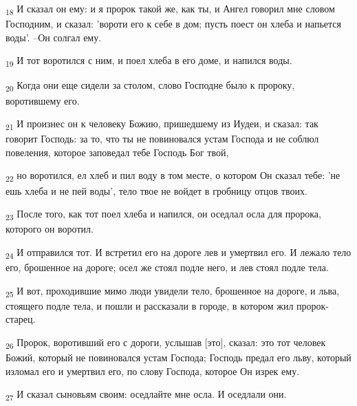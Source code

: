 \begin{tcolorbox}
\textsubscript{18} И сказал он ему: и я пророк такой же, как ты, и Ангел говорил мне словом Господним, и сказал: 'вороти его к себе в дом; пусть поест он хлеба и напьется воды'. --Он солгал ему.
\end{tcolorbox}
\begin{tcolorbox}
\textsubscript{19} И тот воротился с ним, и поел хлеба в его доме, и напился воды.
\end{tcolorbox}
\begin{tcolorbox}
\textsubscript{20} Когда они еще сидели за столом, слово Господне было к пророку, воротившему его.
\end{tcolorbox}
\begin{tcolorbox}
\textsubscript{21} И произнес он к человеку Божию, пришедшему из Иудеи, и сказал: так говорит Господь: за то, что ты не повиновался устам Господа и не соблюл повеления, которое заповедал тебе Господь Бог твой,
\end{tcolorbox}
\begin{tcolorbox}
\textsubscript{22} но воротился, ел хлеб и пил воду в том месте, о котором Он сказал тебе: 'не ешь хлеба и не пей воды', тело твое не войдет в гробницу отцов твоих.
\end{tcolorbox}
\begin{tcolorbox}
\textsubscript{23} После того, как тот поел хлеба и напился, он оседлал осла для пророка, которого он воротил.
\end{tcolorbox}
\begin{tcolorbox}
\textsubscript{24} И отправился тот. И встретил его на дороге лев и умертвил его. И лежало тело его, брошенное на дороге; осел же стоял подле него, и лев стоял подле тела.
\end{tcolorbox}
\begin{tcolorbox}
\textsubscript{25} И вот, проходившие мимо люди увидели тело, брошенное на дороге, и льва, стоящего подле тела, и пошли и рассказали в городе, в котором жил пророк-старец.
\end{tcolorbox}
\begin{tcolorbox}
\textsubscript{26} Пророк, воротивший его с дороги, услышав [это], сказал: это тот человек Божий, который не повиновался устам Господа; Господь предал его льву, который изломал его и умертвил его, по слову Господа, которое Он изрек ему.
\end{tcolorbox}
\begin{tcolorbox}
\textsubscript{27} И сказал сыновьям своим: оседлайте мне осла. И оседлали они.
\end{tcolorbox}
